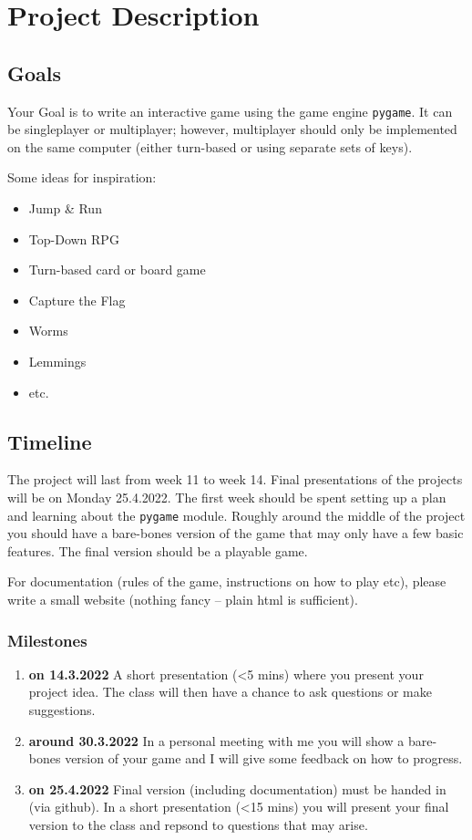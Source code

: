 \documentclass[11pt,a4paper]{report}
\begin{document}
\section{Project Description}

\subsection{Goals} 
Your Goal is to write an interactive game using the game engine \verb|pygame|. It can be singleplayer or multiplayer; however, multiplayer should only be implemented on the same computer (either turn-based or using separate sets of keys).

Some ideas for inspiration:
\begin{itemize}
\item Jump \& Run
\item Top-Down RPG
\item Turn-based card or board game
\item Capture the Flag
\item Worms
\item Lemmings
\item etc.
\end{itemize}
\subsection{Timeline}
The project will last from week 11 to week 14. Final presentations of the projects will be on Monday 25.4.2022. The first week should be spent setting up a plan and learning about the \verb|pygame| module. Roughly around the middle of the project you should have a bare-bones version of the game that may only have a few basic features. The final version should be a playable game.

For documentation (rules of the game, instructions on how to play etc), please write a small website (nothing fancy -- plain html is sufficient).

\subsubsection{Milestones}
\begin{enumerate}
\item {\bf on 14.3.2022} A short presentation (<5 mins) where you present your project idea. The class will then have a chance to ask questions or make suggestions.
\item {\bf around 30.3.2022} In a personal meeting with me you will show a bare-bones version of your game and I will give some feedback on how to progress.
\item {\bf on 25.4.2022} Final version (including documentation) must be handed in (via github). In a short presentation (<15 mins) you will present your final version to the class and repsond to questions that may arise.
\end{enumerate}
\end{document}
